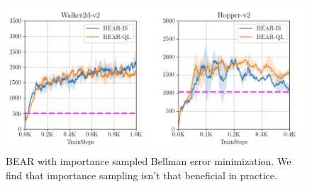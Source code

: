 \begin{figure}
    \centering
    \includegraphics[scale=0.3]{chapters/bear/images/images_camera_ready/is_ablation.png}
    \caption{BEAR with importance sampled Bellman error minimization. We find that importance sampling isn't that beneficial in practice.}
    \label{fig:is}
\end{figure}

